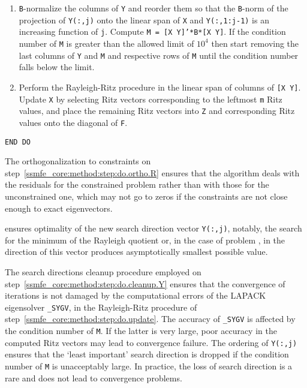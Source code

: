 \begin{itemize}
\begin{enumerate}
{\tt Y = Y - C*(C'*B*Y)}.
%
\item
\label{ssmfe_core:method:step:do.cleanup.Y}
{\tt B}-normalize the columns of {\tt Y} 
and reorder them
so that the {\tt B}-norm of the projection of
{\tt Y(:,j)} onto the linear span of
{\tt X} and {\tt Y(:,1:j-1)} is
an increasing function of {\tt j}.
Compute {\tt M = [X Y]'*B*[X Y]}.
If the condition number of {\tt M}
is greater than the allowed limit
of $10^4$
then start removing the last columns
of {\tt Y} and {\tt M} and respective
rows of {\tt M} until
the condition number falls below the limit.
%
\item
\label{ssmfe_core:method:step:do.update}
Perform the Rayleigh-Ritz procedure
in the linear span of columns of {\tt [X Y]}.
Update {\tt X} by selecting
Ritz vectors corresponding to the leftmost 
{\tt m} Ritz values,
and place the remaining Ritz vectors into {\tt Z}
and corresponding Ritz values onto the diagonal of {\tt F}.
%
\end{enumerate}

{\tt END DO}

\end{itemize}

The orthogonalization to constraints on step~\ref{ssmfe_core:method:step:do.ortho.R}
ensures that the algorithm deals with 
the residuals for the constrained problem
rather than with those for the unconstrained one,
which may not go to zeros
if the constraints are not close enough to exact eigenvectors.

 ensures  optimality of
the new search direction vector {\tt Y(:,j)},
notably, the search for the minimum
of the Rayleigh quotient  or,
in the case of problem , 
in the direction of this vector
produces asymptotically smallest possible value.

The search directions cleanup procedure
employed on step~\ref{ssmfe_core:method:step:do.cleanup.Y}
ensures that the convergence of iterations 
is not damaged by
the computational errors
of the LAPACK eigensolver {\tt \_SYGV},
in the Rayleigh-Ritz procedure of step~\ref{ssmfe_core:method:step:do.update}.
The accuracy of {\tt \_SYGV} is affected
by the condition number of {\tt M}.
If the latter is very large,
poor accuracy in the computed Ritz vectors may
lead to convergence failure.
The ordering of {\tt Y(:,j)} ensures
that the `least important' search direction
is dropped if the condition number of {\tt M}
is unacceptably large.
In practice, the loss of search direction is 
a rare 
and does not lead to convergence problems.

